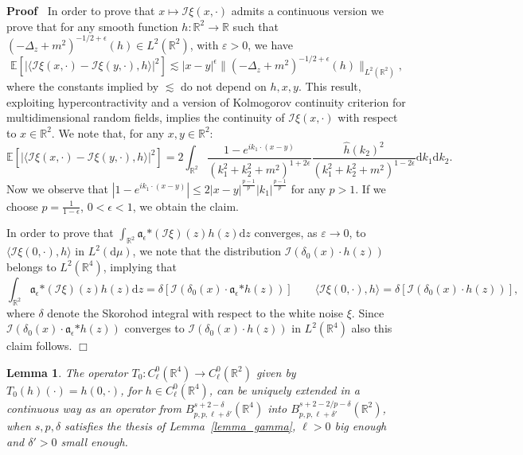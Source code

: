 \documentclass[a4paper,10pt]{article}
\newcommand{\asterisk}{\mathord{*}}
\newcommand{\mathd}{\mathrm{d}}
\newenvironment{proof}{\noindent\textbf{Proof\ }}{\hspace*{\fill}$\Box$\medskip}
\newtheorem{lemma}[theorem]{Lemma}
\begin{document}
\begin{proof}
  In order to prove that $x \longmapsto \mathcal{I} \xi (x, \cdot)$ admits a
  continuous version we prove that for any smooth function $h : \mathbb{R}^2
  \rightarrow \mathbb{R}$ such that $(- \Delta_z + m^2)^{- 1 / 2 + \epsilon}
  (h) \in L^2 (\mathbb{R}^2)$, with $\varepsilon > 0$, we have
  \[ \mathbb{E} [| \langle \mathcal{I} \xi (x, \cdot) - \mathcal{I} \xi (y,
     \cdot), h \rangle |^2] \lesssim | x - y |^{\epsilon} \| (- \Delta_z +
     m^2)^{- 1 / 2 + \epsilon} (h) \|_{L^2 (\mathbb{R}^2)}, \]
  where the constants implied by $\lesssim$ do not depend on $h, x, y$. This
  result, exploiting hypercontractivity and a version of Kolmogorov continuity
  criterion for multidimensional random fields, implies the continuity of
  $\mathcal{I} \xi (x, \cdot)$ with respect to $x \in \mathbb{R}^2$. We note
  that, for any $x, y \in \mathbb{R}^2$:
  \[ \mathbb{E} [| \langle \mathcal{I} \xi (x, \cdot) - \mathcal{I} \xi (y,
     \cdot), h \rangle |^2] = 2 \int_{\mathbb{R}^2} \frac{1 - e^{i k_1 \cdot
     (x - y)}}{(k_1^2 + k_2^2 + m^2)^{1 + 2 \epsilon}} \frac{\hat{h}
     (k_2)^2}{(k_1^2 + k_2^2 + m^2)^{1 - 2 \epsilon}} \mathd k_1 \mathd k_2 .
  \]
  Now we observe that $| 1 - e^{i k_1 \cdot (x - y)} | \leqslant 2 | x - y
  |^{\frac{p - 1}{p}} | k_1 |^{\frac{p - 1}{p}}$ for any $p > 1$. If we choose
  $p = \frac{1}{1 - \epsilon}$, $0 < \epsilon < 1$, we obtain the claim.
  
  In order to prove that $\int_{\mathbb{R}^2} \mathfrak{a}_{\epsilon}
  \asterisk (\mathcal{I} \xi) (z) h (z) \mathd z$ converges, as $\varepsilon
  \rightarrow 0$, to $\langle \mathcal{I} \xi (0, \cdot), h \rangle$ in $L^2
  (\mathd \mu)$, we note that the distribution $\mathcal{I} (\delta_0 (x)
  \cdot h (z))$ belongs to $L^2 (\mathbb{R}^4)$, implying that
  \[ \int_{\mathbb{R}^2} \mathfrak{a}_{\epsilon} \asterisk (\mathcal{I} \xi)
     (z) h (z) \mathd z = \delta [\mathcal{I} (\delta_0 (x) \cdot
     \mathfrak{a}_{\epsilon} \asterisk h (z))] \qquad \langle \mathcal{I} \xi
     (0, \cdot), h \rangle = \delta [\mathcal{I} (\delta_0 (x) \cdot h (z))],
  \]
  where $\delta$ denote the Skorohod integral with respect to the white noise
  $\xi$. Since $\mathcal{I} (\delta_0 (x) \cdot \mathfrak{a}_{\epsilon}
  \asterisk h (z))$ converges to $\mathcal{I} (\delta_0 (x) \cdot h (z))$ in
  $L^2 (\mathbb{R}^4)$ also this claim follows. 
\end{proof}

\begin{lemma}
  \label{lemma_trace}The operator $T_0 : C^0_{\ell} (\mathbb{R}^4) \rightarrow
  C^0_{\ell} (\mathbb{R}^2)$ given by $T_0 (h) (\cdot) = h (0, \cdot)$, for $h
  \in C^0_{\ell} (\mathbb{R}^4)$, can be uniquely extended in a continuous way
  as an operator from $B^{s + 2 - \delta}_{p, p, \ell + \delta'}
  (\mathbb{R}^4)$ into $B^{s + 2 - 2 / p - \delta}_{p, p, \ell + \delta'}
  (\mathbb{R}^2)$, when $s, p, \delta$ satisfies the thesis of
  Lemma~\ref{lemma_gamma}, $\ell > 0$ big enough and $\delta' > 0$ small
  enough.
\end{lemma}
\end{document}
